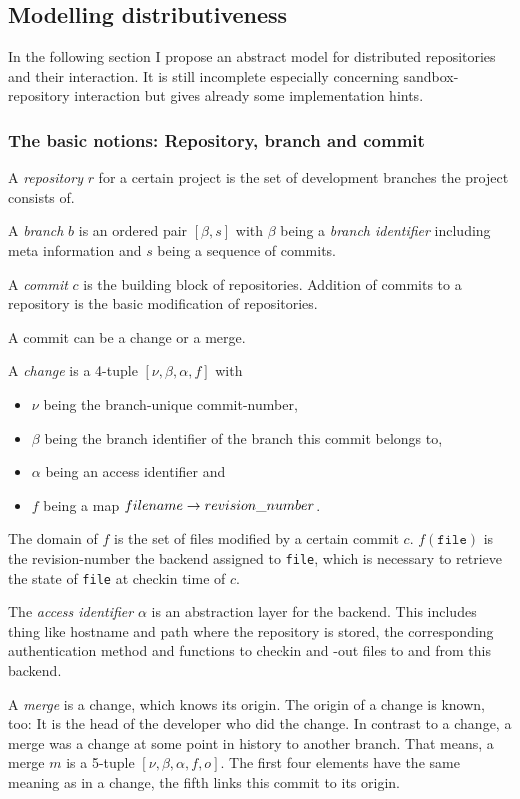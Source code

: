 \documentclass[fleqn, 10pt, a4paper]{article}
\begin{document}
\subsection{Modelling distributiveness}

In the following section I propose an abstract model for distributed
repositories and their interaction. It is still incomplete
especially concerning sandbox-repository interaction but gives already
some implementation hints.

\subsubsection{The basic notions: Repository, branch and commit}

A \emph{repository} $r$ for a certain project is the set of development
branches the project consists of.

A \emph{branch} $b$ is an ordered pair $[\beta, s]$ with $\beta$ being
a \emph{branch identifier} including meta information and $s$ being
a sequence of commits.

A \emph{commit} $c$ is the building block of repositories.
Addition of commits to a repository is the basic modification
of repositories.

A commit can be a change or a merge.

A \emph{change} is a 4-tuple $[\nu, \beta, \alpha, f]$ with
\begin{itemize}
\item $\nu$ being the branch-unique commit-number,
\item $\beta$ being the branch identifier of the branch
this commit belongs to,
\item $\alpha$ being an access identifier and
\item $f$ being a map $\mathnormal{filename} \rightarrow
\mathnormal{revision\_number}$.
\end{itemize}

The domain of $f$ is the set of files modified by a certain
commit $c$. $f(\mathtt{file})$ is the revision-number the
backend assigned to \texttt{file}, which is necessary to
retrieve the state of \texttt{file} at checkin time of $c$.

The \emph{access identifier} $\alpha$ is an abstraction layer for the
backend. This includes thing like hostname and path where the
repository is stored, the corresponding authentication method
and functions to checkin and -out files to and from this backend.

A \emph{merge} is a change, which knows its origin. The origin of
a change is known, too: It is the head of the developer who did the
change. In contrast to a change, a merge was a change at some
point in history to another branch. That means, a merge $m$ is
a 5-tuple $[\nu, \beta, \alpha, f, o]$. The first four elements
have the same meaning as in a change, the fifth links this commit
to its origin.
\end{document}
